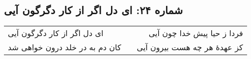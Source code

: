 \begin{center}
\section*{شماره ۲۴: ای دل اگر از کار دگرگون آیی}
\label{sec:024}
\begin{longtable}{l p{0.5cm} r}
ای دل اگر از کار دگرگون آیی
&&
فردا ز حیا پیش خدا چون آیی
\\
کان دم به در خلد درون خواهی شد
&&
کز عهدهٔ هر چه هست بیرون آیی
\\
\end{longtable}
\end{center}
